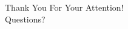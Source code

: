 \documentclass{beamer}
\begin{document}
\begin{frame}
\begin{center}
{\huge Thank You For Your Attention!} \\
\vspace*{1.5cm}
{\Large Questions?}
\end{center}

\end{frame}

\appendix
{}
\setcounter{finalframe}{\value{framenumber}}

\setcounter{framenumber}{\value{finalframe}}
\end{document}
